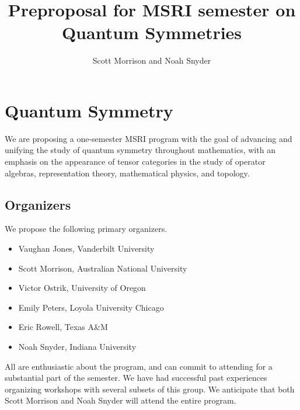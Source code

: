 \documentclass[11pt]{article}
\title{Preproposal for MSRI semester on \textbf{Quantum Symmetries}}
\author{Scott Morrison and Noah Snyder}
\begin{document}
\maketitle



\section{Quantum Symmetry}


We are proposing a one-semester MSRI program with the goal of advancing and unifying the study of quantum symmetry throughout mathematics, with an emphasis on the appearance of tensor categories in the study of operator algebras, representation theory, mathematical physics, and topology.

\subsection{Organizers}
We propose the following primary organizers.
\begin{itemize}
  \setlength{\itemsep}{1pt}
  \setlength{\parskip}{0pt}
  \setlength{\parsep}{0pt}
\item Vaughan Jones, Vanderbilt University
\item Scott Morrison, Australian National University
\item Victor Ostrik, University of Oregon
\item Emily Peters, Loyola University Chicago
\item Eric Rowell, Texas A\&M
\item Noah Snyder, Indiana University
\end{itemize}
All are enthusiastic about the program, and can commit to attending for a substantial part of the semester. We have had successful past experiences organizing workshops with several subsets of this group.  We anticipate that both Scott Morrison and Noah Snyder will attend the entire program.
\end{document}

